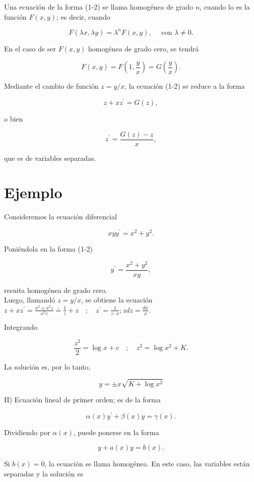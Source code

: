 \documentclass[10pt]{article}
\theoremstyle{plain}
\theoremstyle{definition}
\theoremstyle{remark}
\begin{document}
Una ecuación de la forma (1-2) se llama homogénea de grado $n$, cuando lo es la función $F(x, y)$; es decir, cuando

$$
F(\lambda x, \lambda y)=\lambda^{n} F(x, y), \quad \text { con } \lambda \neq 0 .
$$

En el caso de ser $F(x, y)$ homogénea de grado cero, se tendrá

$$
F(x, y)=F\left(1, \frac{y}{x}\right)=G\left(\frac{y}{x}\right) .
$$

Mediante el cambio de función $z=y / x$, la ecuación (1-2) se reduce a la forma

$$
z+x z^{\prime}=G(z),
$$

o bien

$$
z^{\prime}=\frac{G(z)-z}{x},
$$

que es de variables separadas.

\section*{Ejemplo}
Consideremos la ecuación diferencial

$$
x y y^{\prime}=x^{2}+y^{2} .
$$

Poniéndola en la forma (1-2)

$$
y^{\prime}=\frac{x^{2}+y^{2}}{x y},
$$

resuita homogénea de grado cero.\\
Luego, llamandó $z=y / x$, se obtiene la ecuación\\
$z+x z^{\prime}=\frac{x^{2}+x^{2} z}{x^{2} z} \doteq \frac{1}{z}+z \quad ; \quad z^{\prime}=\frac{1}{z \cdot x} ; z d z=\frac{d x}{x}$.

Integrando

$$
\frac{z^{2}}{2}=\log x+c \quad ; \quad z^{2}=\log x^{2}+K .
$$

La solución es, por lo tanto,

$$
y= \pm x \sqrt{K+\log x^{2}}
$$

II) Ecuación lineal de primer orden; es de la forma

$$
\alpha(x) y^{\prime}+\beta(x) y=\gamma(x) .
$$

Dividiendo por $\alpha(x)$, puede ponerse en la forma


\begin{equation*}
y+a(x) y=b(x) . \tag{4-2}
\end{equation*}


Si $b(x)=0$, la ecuación se llama homogénea. En este caso, las variables están separadas y la solución es
\end{document}
